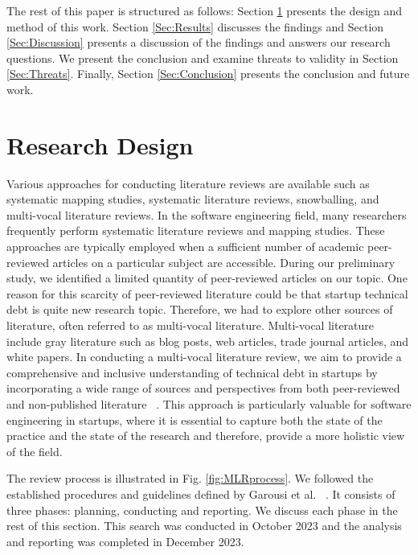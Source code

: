 The rest of this paper is structured as follows: Section \ref{Sec:Research} presents the design and method of this work.
Section \ref{Sec:Results} discusses the findings and Section \ref{Sec:Discussion} presents a discussion of the findings and answers our research questions.
We present the conclusion and examine threats to validity in Section \ref{Sec:Threats}.
Finally, Section \ref{Sec:Conclusion} presents the conclusion and future work.

\section{Research Design}\label{Sec:Research}
Various approaches for conducting literature reviews are available such as systematic mapping studies, systematic literature reviews, snowballing, and multi-vocal literature reviews.
In the software engineering field, many researchers frequently perform systematic literature reviews and mapping studies.
These approaches are typically employed when a sufficient number of academic peer-reviewed articles on a particular subject are accessible.
During our preliminary study, we identified a limited quantity of peer-reviewed articles on our topic.
One reason for this scarcity of peer-reviewed literature could be that startup technical debt is quite new research topic.
Therefore, we had to explore other sources of literature, often referred to as multi-vocal literature.
Multi-vocal literature include gray literature such as blog posts, web articles, trade journal articles, and white papers.
In conducting a multi-vocal literature review, we aim to provide a comprehensive and inclusive understanding of technical debt in startups by incorporating a wide range of sources and perspectives from both peer-reviewed and non-published literature ~\cite{Ogawa91, Garousi2016/2915970.2916008}.
This approach is particularly valuable for software engineering in startups, where it is essential to capture both the state of the practice and the state of the research and therefore, provide a more holistic view of the field. 

The review process is illustrated in Fig. \ref{fig:MLRprocess}.
We followed the established procedures and guidelines defined by Garousi et al. ~\cite{GAROUSI2019101}.
It consists of three phases: planning, conducting and reporting.
We discuss each phase in the rest of this section.
This search was conducted in October 2023 and the analysis and reporting was completed in December 2023.

